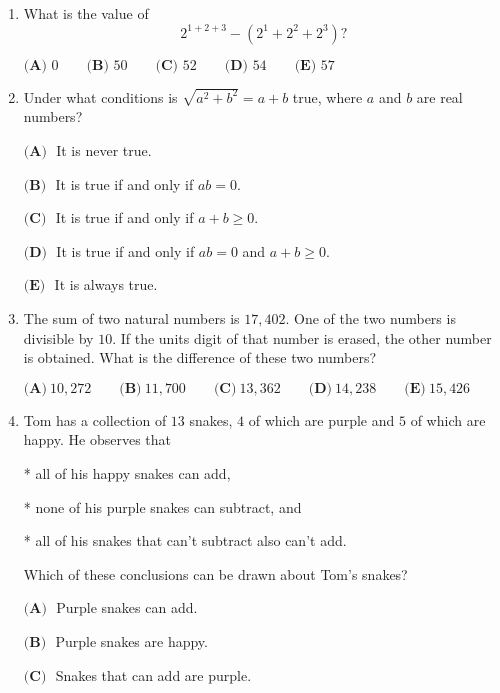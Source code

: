 \documentclass{article}
\begin{document}
\begin{enumerate}[label=\arabic*., itemsep=0.5em]
\item What is the value of
\begin{equation*}
2^{1+2+3}-(2^1+2^2+2^3)?
\end{equation*}

\(\textbf{(A) }0 \qquad \textbf{(B) }50 \qquad \textbf{(C) }52 \qquad \textbf{(D) }54 \qquad \textbf{(E) }57\)\par \vspace{0.5em}\item Under what conditions is \(\sqrt{a^2+b^2}=a+b\) true, where \(a\) and \(b\) are real numbers?

\(\textbf{(A) }\) It is never true.

\(\textbf{(B) }\) It is true if and only if \(ab=0\).

\(\textbf{(C) }\) It is true if and only if \(a+b\ge 0\).

\(\textbf{(D) }\) It is true if and only if \(ab=0\) and \(a+b\ge 0\).

\(\textbf{(E) }\) It is always true.\par \vspace{0.5em}\item The sum of two natural numbers is \(17{,}402\). One of the two numbers is divisible by \(10\). If the units digit of that number is erased, the other number is obtained. What is the difference of these two numbers?

\(\textbf{(A)} ~10{,}272\qquad\textbf{(B)} ~11{,}700\qquad\textbf{(C)} ~13{,}362\qquad\textbf{(D)} ~14{,}238\qquad\textbf{(E)} ~15{,}426\)\par \vspace{0.5em}\item Tom has a collection of \(13\) snakes, \(4\) of which are purple and \(5\) of which are happy. He observes that

* all of his happy snakes can add,

* none of his purple snakes can subtract, and

* all of his snakes that can't subtract also can't add.

Which of these conclusions can be drawn about Tom's snakes?

\(\textbf{(A) }\) Purple snakes can add.

\(\textbf{(B) }\) Purple snakes are happy.

\(\textbf{(C) }\) Snakes that can add are purple.


\end{enumerate}
\end{document}
